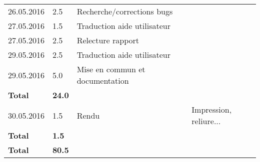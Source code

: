 \documentclass[french]{article}
\begin{document}
\begin{longtable}{p{}|p{}|p{}|p{}}
		26.05.2016 & 2.5 & Recherche/corrections bugs & \\
		27.05.2016 & 1.5 & Traduction aide utilisateur & \\
		27.05.2016 & 2.5 & Relecture rapport & \\
		29.05.2016 & 2.5 & Traduction aide utilisateur & \\
		29.05.2016 & 5.0 & Mise en commun et documentation & \\
		\textbf{Total} & \textbf{24.0} &&\\
		\hline
		30.05.2016 & 1.5 & Rendu & Impression, reliure... \\
		\textbf{Total} & \textbf{1.5} &&\\
		\hline
		\hline
		\textbf{Total} & \textbf{80.5} &&\\	
	\end{longtable}
	
\end{document}
